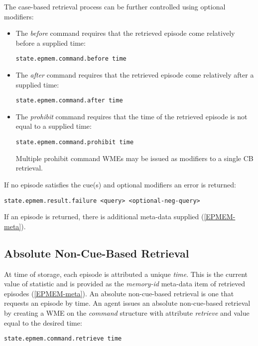 The case-based retrieval process can be further controlled using optional modifiers:

\begin{itemize}
\item The \emph{before} command requires that the retrieved episode come relatively before a supplied time:
\begin{verbatim}
state.epmem.command.before time
\end{verbatim}

\item The \emph{after} command requires that the retrieved episode come relatively after a supplied time:
\begin{verbatim}
state.epmem.command.after time
\end{verbatim}

\item The \emph{prohibit} command requires that the time of the retrieved episode is not equal to a supplied time:
\begin{verbatim}
state.epmem.command.prohibit time
\end{verbatim}
Multiple prohibit command WMEs may be issued as modifiers to a single CB retrieval.

\end{itemize}

If no episode satisfies the cue(s) and optional modifiers an error is returned:

\begin{verbatim}
state.epmem.result.failure <query> <optional-neg-query>
\end{verbatim}

If an episode is returned, there is additional meta-data supplied (\ref{EPMEM-meta}).

\subsection{Absolute Non-Cue-Based Retrieval}
At time of storage, each episode is attributed a unique \emph{time}.  This is the current value of  statistic and is provided as the \emph{memory-id} meta-data item of retrieved episodes (\ref{EPMEM-meta}).  An absolute non-cue-based retrieval is one that requests an episode by time.  An agent issues an absolute non-cue-based retrieval by creating a WME on the \emph{command} structure with attribute \emph{retrieve} and value equal to the desired time:

\begin{verbatim}
state.epmem.command.retrieve time
\end{verbatim}

